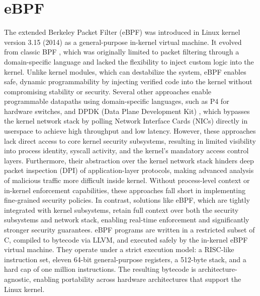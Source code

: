 \documentclass [11pt, proquest] {uwthesis}[2020/02/24]
\begin{document}
\section{eBPF}
The extended Berkeley Packet Filter (eBPF) was introduced in Linux kernel version 3.15 (2014) as a general-purpose in-kernel virtual machine. It evolved from classic BPF \cite{10.5555/1267303.1267305}, which was originally limited to packet filtering through a domain-specific language and lacked the flexibility to inject custom logic into the kernel.
Unlike kernel modules, which can destabilize the system, eBPF enables safe, dynamic programmability by injecting verified code into the kernel without compromising stability or security. Several other approaches enable programmable datapaths using domain-specific languages, such as P4 \cite{bosshart2014p4} for hardware switches, and DPDK (Data Plane Development Kit) \cite{8701793}, which bypasses the kernel network stack by polling Network Interface Cards (NICs) directly in userspace to achieve high throughput and low latency. However, these approaches lack direct access to core kernel security subsystems, resulting in limited visibility into process identity, syscall activity, and the kernel’s mandatory access control layers. Furthermore, their abstraction over the kernel network stack hinders deep packet inspection (DPI) of application-layer protocols, making advanced analysis of malicious traffic more difficult inside kernel. Without process-level context or in-kernel enforcement capabilities, these approaches fall short in implementing fine-grained security policies. In contrast, solutions like eBPF, which are tightly integrated with kernel subsystems, retain full context over both the security subsystems and network stack, enabling real-time enforcement and significantly stronger security guarantees. eBPF programs are written in a restricted subset of C, compiled to bytecode via LLVM, and executed safely by the in-kernel eBPF virtual machine. They operate under a strict execution model: a RISC-like instruction set, eleven 64-bit general-purpose registers, a 512-byte stack, and a hard cap of one million instructions. The resulting bytecode is architecture-agnostic, enabling portability across hardware architectures that support the Linux kernel.
\end{document}
